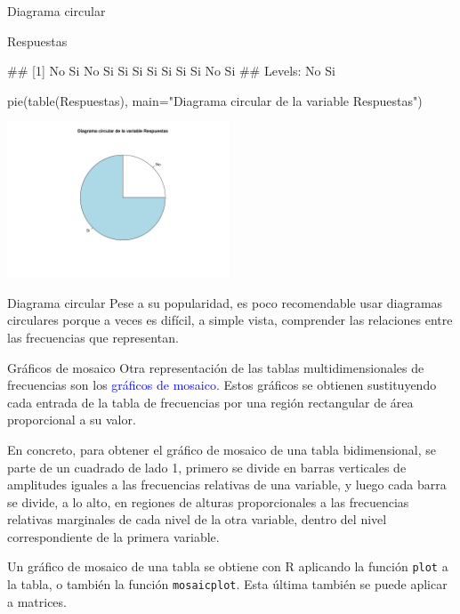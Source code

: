 \documentclass[
  ignorenonframetext,
  aspectratio=169]{beamer}
\newenvironment{Shaded}{\begin{snugshade}}{\end{snugshade}}
\newcommand{\AttributeTok}[1]{\textcolor[rgb]{0.77,0.63,0.00}{#1}}
\newcommand{\FunctionTok}[1]{\textcolor[rgb]{0.00,0.00,0.00}{#1}}
\newcommand{\NormalTok}[1]{#1}
\newcommand{\StringTok}[1]{\textcolor[rgb]{0.31,0.60,0.02}{#1}}
\let\oldverbatim\verbatim
\let\endoldverbatim\endverbatim
\renewenvironment{verbatim}{\tiny\oldverbatim}{\endoldverbatim}
\newcommand\blue[1]{\textcolor{blue}{#1}}
\begin{document}
\begin{frame}[fragile]{Diagrama circular}
\protect\hypertarget{diagrama-circular-2}{}
\begin{Shaded}
\begin{Highlighting}[]
\NormalTok{Respuestas}
\end{Highlighting}
\end{Shaded}

\begin{verbatim}
##  [1] No Si No Si Si Si Si Si Si Si No Si
## Levels: No Si
\end{verbatim}

\begin{Shaded}
\begin{Highlighting}[]
\FunctionTok{pie}\NormalTok{(}\FunctionTok{table}\NormalTok{(Respuestas), }\AttributeTok{main=}\StringTok{"Diagrama circular de la variable Respuestas"}\NormalTok{)}
\end{Highlighting}
\end{Shaded}

\begin{center}\includegraphics[width=250px]{Hora3_files/figure-beamer/unnamed-chunk-40-1} \end{center}
\end{frame}

\begin{frame}{Diagrama circular}
\protect\hypertarget{diagrama-circular-3}{}
Pese a su popularidad, es poco recomendable usar diagramas circulares
porque a veces es difícil, a simple vista, comprender las relaciones
entre las frecuencias que representan.
\end{frame}

\begin{frame}[fragile]{Gráficos de mosaico}
\protect\hypertarget{gruxe1ficos-de-mosaico}{}
Otra representación de las tablas multidimensionales de frecuencias son
los \blue{gráficos de mosaico}. Estos gráficos se obtienen sustituyendo
cada entrada de la tabla de frecuencias por una región rectangular de
área proporcional a su valor.

En concreto, para obtener el gráfico de mosaico de una tabla
bidimensional, se parte de un cuadrado de lado 1, primero se divide en
barras verticales de amplitudes iguales a las frecuencias relativas de
una variable, y luego cada barra se divide, a lo alto, en regiones de
alturas proporcionales a las frecuencias relativas marginales de cada
nivel de la otra variable, dentro del nivel correspondiente de la
primera variable.

Un gráfico de mosaico de una tabla se obtiene con R aplicando la función
\texttt{plot} a la tabla, o también la función \texttt{mosaicplot}. Esta
última también se puede aplicar a matrices.
\end{frame}
\end{document}

